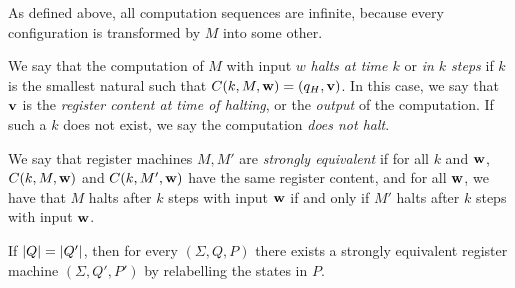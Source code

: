 \begin{remark}
	As defined above, all computation sequences are infinite, because every configuration is transformed by \( M \) into some other.
\end{remark}
\begin{definition}
	We say that the computation of \( M \) with input \( w \) \emph{halts at time \( k \)} or \emph{in \( k \) steps} if \( k \) is the smallest natural such that \( C(k,M,\vb w) = (q_H,\vb v) \).
	In this case, we say that \( \vb v \) is the \emph{register content at time of halting}, or the \emph{output} of the computation.
	If such a \( k \) does not exist, we say the computation \emph{does not halt}.
\end{definition}
\begin{definition}
	We say that register machines \( M, M' \) are \emph{strongly equivalent} if for all \( k \) and \( \vb w \), \( C(k,M,\vb w) \) and \( C(k,M',\vb w) \) have the same register content, and for all \( \vb w \), we have that \( M \) halts after \( k \) steps with input \( \vb w \) if and only if \( M' \) halts after \( k \) steps with input \( \vb w \).
\end{definition}
\begin{remark}
	If \( \abs{Q} = \abs{Q'} \), then for every \( (\Sigma, Q, P) \) there exists a strongly equivalent register machine \( (\Sigma, Q', P') \) by relabelling the states in \( P \).
\end{remark}

